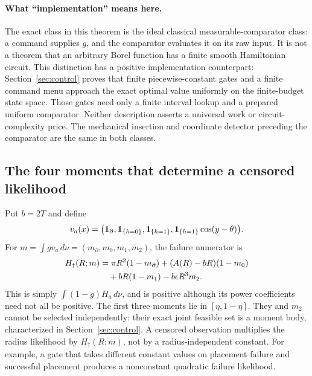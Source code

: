 \paragraph{What ``implementation'' means here.}
The exact class in this theorem is the ideal classical measurable-comparator
class: a command supplies $g$, and the comparator evaluates it on its raw
input. It is not a theorem that an arbitrary Borel function has a finite
smooth Hamiltonian circuit. This distinction has a positive implementation
counterpart: Section~\ref{sec:control} proves that finite piecewise-constant
gates and a finite command menu approach the exact optimal value uniformly
on the finite-budget state space. Those gates need only a finite interval
lookup and a prepared uniform comparator. Neither description asserts a
universal work or circuit-complexity price. The mechanical insertion and
coordinate detector preceding the comparator are the same in both classes.

\subsection{The four moments that determine a censored likelihood}
Put $b=2T$ and define
\[
 v_a(x)=\bigl(\mathbf1_{\partial},\mathbf1_{\{h=0\}},
                  \mathbf1_{\{h=1\}},\mathbf1_{\{h=1\}}\cos(y-\theta)\bigr).
\]
For $m=\int g v_a\,d\nu=(m_\partial,m_0,m_1,m_2)$, the failure numerator is
\begin{align}
 H_\dagger(R;m)
 &=\pi R^2(1-m_\partial)+(A(R)-bR)(1-m_0)\notag\\
 &\quad+bR(1-m_1)-b\epsilon R^3m_2.
 \label{eq:failure-poly}
\end{align}
This is simply $\int(1-g)H_a\,d\nu$, and is positive although its power
coefficients need not all be positive. The first three moments lie in
$[\eta,1-\eta]$. They and $m_2$ cannot be selected independently: their exact
joint feasible set is a moment body, characterized in Section~\ref{sec:control}.
A censored observation multiplies the radius likelihood by
$H_\dagger(R;m)$, not by a radius-independent constant. For example, a gate
that takes different constant values on placement failure and successful
placement produces a nonconstant quadratic failure likelihood.


